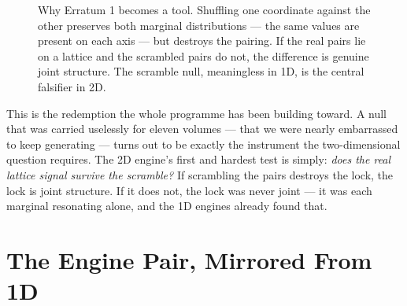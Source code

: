 \documentclass[11pt, letterpaper, openany]{book}
\begin{document}
\begin{figure}[H]
\centering
{}
\caption{Why Erratum 1 becomes a tool. Shuffling one coordinate against the other preserves both
marginal distributions --- the same values are present on each axis --- but destroys the pairing.
If the real pairs lie on a lattice and the scrambled pairs do not, the difference is genuine joint
structure. The scramble null, meaningless in 1D, is the central falsifier in 2D.}
\end{figure}

\begin{signalbox}
This is the redemption the whole programme has been building toward. A null that was carried
uselessly for eleven volumes --- that we were nearly embarrassed to keep generating --- turns out
to be exactly the instrument the two-dimensional question requires. The 2D engine's first and
hardest test is simply: \emph{does the real lattice signal survive the scramble?} If scrambling
the pairs destroys the lock, the lock is joint structure. If it does not, the lock was never
joint --- it was each marginal resonating alone, and the 1D engines already found that.
\end{signalbox}

\section{The Engine Pair, Mirrored From 1D}
\end{document}
